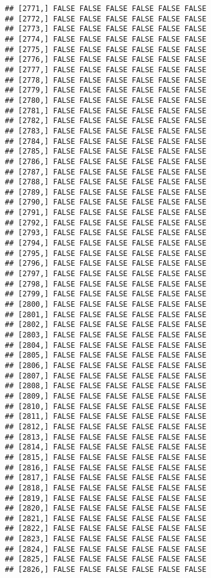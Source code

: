\documentclass[
]{article}
\begin{document}
\begin{verbatim}
## [2771,] FALSE FALSE FALSE FALSE FALSE FALSE
## [2772,] FALSE FALSE FALSE FALSE FALSE FALSE
## [2773,] FALSE FALSE FALSE FALSE FALSE FALSE
## [2774,] FALSE FALSE FALSE FALSE FALSE FALSE
## [2775,] FALSE FALSE FALSE FALSE FALSE FALSE
## [2776,] FALSE FALSE FALSE FALSE FALSE FALSE
## [2777,] FALSE FALSE FALSE FALSE FALSE FALSE
## [2778,] FALSE FALSE FALSE FALSE FALSE FALSE
## [2779,] FALSE FALSE FALSE FALSE FALSE FALSE
## [2780,] FALSE FALSE FALSE FALSE FALSE FALSE
## [2781,] FALSE FALSE FALSE FALSE FALSE FALSE
## [2782,] FALSE FALSE FALSE FALSE FALSE FALSE
## [2783,] FALSE FALSE FALSE FALSE FALSE FALSE
## [2784,] FALSE FALSE FALSE FALSE FALSE FALSE
## [2785,] FALSE FALSE FALSE FALSE FALSE FALSE
## [2786,] FALSE FALSE FALSE FALSE FALSE FALSE
## [2787,] FALSE FALSE FALSE FALSE FALSE FALSE
## [2788,] FALSE FALSE FALSE FALSE FALSE FALSE
## [2789,] FALSE FALSE FALSE FALSE FALSE FALSE
## [2790,] FALSE FALSE FALSE FALSE FALSE FALSE
## [2791,] FALSE FALSE FALSE FALSE FALSE FALSE
## [2792,] FALSE FALSE FALSE FALSE FALSE FALSE
## [2793,] FALSE FALSE FALSE FALSE FALSE FALSE
## [2794,] FALSE FALSE FALSE FALSE FALSE FALSE
## [2795,] FALSE FALSE FALSE FALSE FALSE FALSE
## [2796,] FALSE FALSE FALSE FALSE FALSE FALSE
## [2797,] FALSE FALSE FALSE FALSE FALSE FALSE
## [2798,] FALSE FALSE FALSE FALSE FALSE FALSE
## [2799,] FALSE FALSE FALSE FALSE FALSE FALSE
## [2800,] FALSE FALSE FALSE FALSE FALSE FALSE
## [2801,] FALSE FALSE FALSE FALSE FALSE FALSE
## [2802,] FALSE FALSE FALSE FALSE FALSE FALSE
## [2803,] FALSE FALSE FALSE FALSE FALSE FALSE
## [2804,] FALSE FALSE FALSE FALSE FALSE FALSE
## [2805,] FALSE FALSE FALSE FALSE FALSE FALSE
## [2806,] FALSE FALSE FALSE FALSE FALSE FALSE
## [2807,] FALSE FALSE FALSE FALSE FALSE FALSE
## [2808,] FALSE FALSE FALSE FALSE FALSE FALSE
## [2809,] FALSE FALSE FALSE FALSE FALSE FALSE
## [2810,] FALSE FALSE FALSE FALSE FALSE FALSE
## [2811,] FALSE FALSE FALSE FALSE FALSE FALSE
## [2812,] FALSE FALSE FALSE FALSE FALSE FALSE
## [2813,] FALSE FALSE FALSE FALSE FALSE FALSE
## [2814,] FALSE FALSE FALSE FALSE FALSE FALSE
## [2815,] FALSE FALSE FALSE FALSE FALSE FALSE
## [2816,] FALSE FALSE FALSE FALSE FALSE FALSE
## [2817,] FALSE FALSE FALSE FALSE FALSE FALSE
## [2818,] FALSE FALSE FALSE FALSE FALSE FALSE
## [2819,] FALSE FALSE FALSE FALSE FALSE FALSE
## [2820,] FALSE FALSE FALSE FALSE FALSE FALSE
## [2821,] FALSE FALSE FALSE FALSE FALSE FALSE
## [2822,] FALSE FALSE FALSE FALSE FALSE FALSE
## [2823,] FALSE FALSE FALSE FALSE FALSE FALSE
## [2824,] FALSE FALSE FALSE FALSE FALSE FALSE
## [2825,] FALSE FALSE FALSE FALSE FALSE FALSE
## [2826,] FALSE FALSE FALSE FALSE FALSE FALSE

\end{verbatim}
\end{document}
